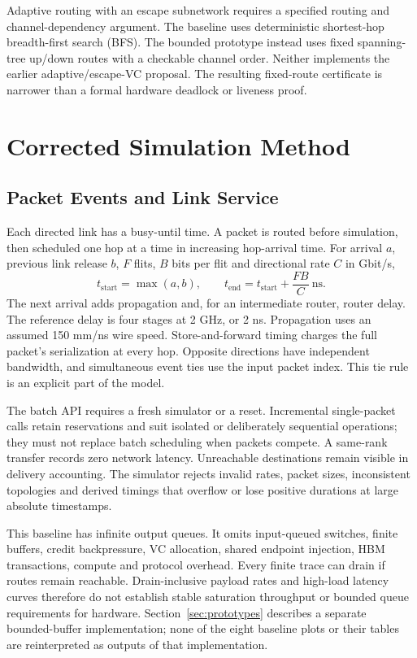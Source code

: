 \documentclass[11pt,a4paper]{article}
\begin{document}
Adaptive routing with an escape subnetwork requires a specified routing and
channel-dependency argument\cite{duato1993new}. The baseline uses deterministic
shortest-hop breadth-first search (BFS). The bounded prototype instead uses
fixed spanning-tree up/down routes with a checkable channel order. Neither
implements the earlier adaptive/escape-VC proposal. The resulting fixed-route
certificate is narrower than a formal hardware deadlock or liveness proof.

\section{Corrected Simulation Method}\label{sec:method}

\subsection{Packet Events and Link Service}

Each directed link has a busy-until time. A packet is routed before
simulation, then scheduled one hop at a time in increasing hop-arrival time.
For arrival $a$, previous link release $b$, $F$ flits, $B$ bits per flit and
directional rate $C$ in Gbit/s,
\begin{equation}
t_{\mathrm{start}}=\max(a,b),\qquad
t_{\mathrm{end}}=t_{\mathrm{start}}+\frac{FB}{C}\ \mathrm{ns}.
\end{equation}
The next arrival adds propagation and, for an intermediate router, router
delay. The reference delay is four stages at 2 GHz, or 2 ns. Propagation uses
an assumed 150 mm/ns wire speed. Store-and-forward timing charges the full
packet's serialization at every hop. Opposite directions have independent
bandwidth, and simultaneous event ties use the input packet index. This tie
rule is an explicit part of the model.

The batch API requires a fresh simulator or a reset. Incremental
single-packet calls retain reservations and suit isolated or deliberately
sequential operations; they must not replace batch scheduling when packets
compete. A same-rank transfer records zero network latency. Unreachable
destinations remain visible in delivery accounting. The simulator rejects
invalid rates, packet sizes, inconsistent topologies and derived timings
that overflow or lose positive durations at large absolute timestamps.

This baseline has infinite output queues. It omits input-queued switches,
finite buffers, credit backpressure, VC allocation, shared endpoint
injection, HBM transactions, compute and protocol overhead. Every finite
trace can drain if routes remain reachable. Drain-inclusive payload rates
and high-load latency curves therefore do not establish stable saturation
throughput or bounded queue requirements for hardware. Section~\ref{sec:prototypes}
describes a separate bounded-buffer implementation; none of the eight baseline
plots or their tables are reinterpreted as outputs of that implementation.
\end{document}
